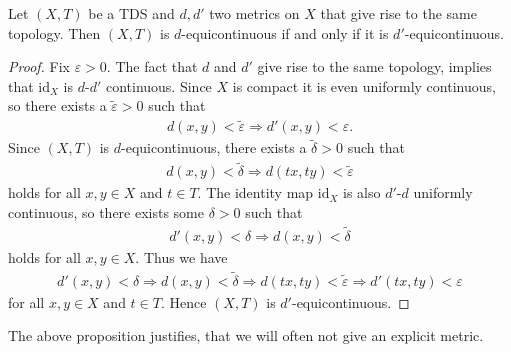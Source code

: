 \begin{proposition}
	Let $(X, T)$ be a TDS and $d, d'$ two metrics on $X$ that give rise to the same topology. Then $(X, T)$ is $d$-equicontinuous if and only if it is $d'$-equicontinuous.
\end{proposition}
\begin{proof}
	Fix $\varepsilon > 0$. The fact that $d$ and $d'$ give rise to the same topology, implies that $\mathrm{id}_X$ is $d$-$d'$ continuous. Since $X$ is compact it is even uniformly continuous, so there exists a $\tilde{\varepsilon} > 0$ such that
	\begin{align*}
		d(x, y) < \tilde{\varepsilon} \Rightarrow d'(x, y) < \varepsilon.
	\end{align*}
	Since $(X, T)$ is $d$-equicontinuous, there exists a $\tilde{\delta} > 0$ such that
	\begin{align*}
		d(x, y) < \tilde{\delta} \Rightarrow d(tx, ty) < \tilde{\varepsilon}
	\end{align*}
	holds for all $x, y \in X$ and $t \in T$. The identity map $\mathrm{id}_X$ is also $d'$-$d$ uniformly continuous, so there exists some $\delta > 0$ such that
	\begin{align*}
		d'(x, y) < \delta \Rightarrow d(x, y) < \tilde{\delta}
	\end{align*}
	holds for all $x, y \in X$. Thus we have
	\begin{align*}
		d'(x, y) < \delta \Rightarrow d(x, y) < \tilde{\delta} \Rightarrow d(tx, ty) < \tilde{\varepsilon} \Rightarrow d'(tx, ty) < \varepsilon
	\end{align*}
	for all $x, y \in X$ and $t \in T$. Hence $(X, T)$ is $d'$-equicontinuous.
\end{proof}

\begin{remark}
	The above proposition justifies, that we will often not give an explicit metric.
\end{remark}

